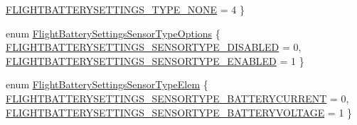 \begin{DoxyCompactItemize}
\*
\hyperlink{group___flight_battery_settings_gga1c8e1982080629262503c2a810321f1eae8d94f78e31ab38445f85b514dc432bb}{\-F\-L\-I\-G\-H\-T\-B\-A\-T\-T\-E\-R\-Y\-S\-E\-T\-T\-I\-N\-G\-S\-\_\-\-T\-Y\-P\-E\-\_\-\-N\-O\-N\-E} = 4
 \}
\item 
enum \hyperlink{group___flight_battery_settings_gafb3beceb37d2c838a0818910cbb2ad5c}{\-Flight\-Battery\-Settings\-Sensor\-Type\-Options} \{ \hyperlink{group___flight_battery_settings_ggafb3beceb37d2c838a0818910cbb2ad5ca8d096b70e1584feca67a237252cc530b}{\-F\-L\-I\-G\-H\-T\-B\-A\-T\-T\-E\-R\-Y\-S\-E\-T\-T\-I\-N\-G\-S\-\_\-\-S\-E\-N\-S\-O\-R\-T\-Y\-P\-E\-\_\-\-D\-I\-S\-A\-B\-L\-E\-D} = 0, 
\hyperlink{group___flight_battery_settings_ggafb3beceb37d2c838a0818910cbb2ad5ca728876dd7f79ca5ef7610d9411f3c590}{\-F\-L\-I\-G\-H\-T\-B\-A\-T\-T\-E\-R\-Y\-S\-E\-T\-T\-I\-N\-G\-S\-\_\-\-S\-E\-N\-S\-O\-R\-T\-Y\-P\-E\-\_\-\-E\-N\-A\-B\-L\-E\-D} = 1
 \}
\item 
enum \hyperlink{group___flight_battery_settings_ga42fbfe59ddcaf7869746db389a622208}{\-Flight\-Battery\-Settings\-Sensor\-Type\-Elem} \{ \hyperlink{group___flight_battery_settings_gga42fbfe59ddcaf7869746db389a622208a59ce1152df3be324c96f21cb3296bcf7}{\-F\-L\-I\-G\-H\-T\-B\-A\-T\-T\-E\-R\-Y\-S\-E\-T\-T\-I\-N\-G\-S\-\_\-\-S\-E\-N\-S\-O\-R\-T\-Y\-P\-E\-\_\-\-B\-A\-T\-T\-E\-R\-Y\-C\-U\-R\-R\-E\-N\-T} = 0, 
\hyperlink{group___flight_battery_settings_gga42fbfe59ddcaf7869746db389a622208aacb0ddb536969e5eacb4b2274e64155b}{\-F\-L\-I\-G\-H\-T\-B\-A\-T\-T\-E\-R\-Y\-S\-E\-T\-T\-I\-N\-G\-S\-\_\-\-S\-E\-N\-S\-O\-R\-T\-Y\-P\-E\-\_\-\-B\-A\-T\-T\-E\-R\-Y\-V\-O\-L\-T\-A\-G\-E} = 1
 \}
\end{DoxyCompactItemize}
